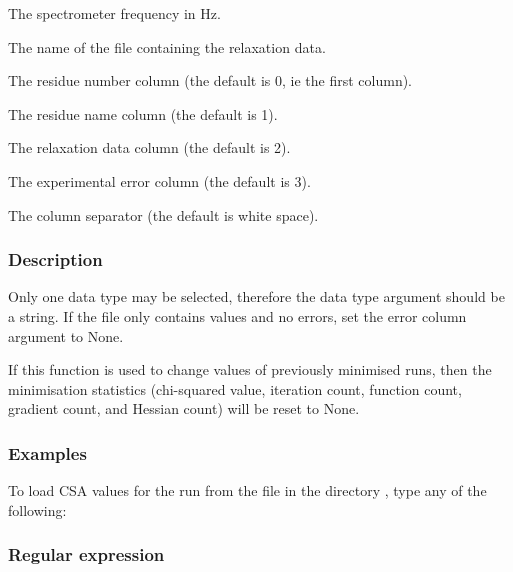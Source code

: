   The spectrometer frequency in Hz. 

  The name of the file containing the relaxation data. 

  The residue number column (the default is 0, ie the first column). 

  The residue name column (the default is 1). 

  The relaxation data column (the default is 2). 

  The experimental error column (the default is 3). 

  The column separator (the default is white space). 




\subsubsection{Description}

Only one data type may be selected, therefore the data type argument should be a string.  If the file only contains values and no errors, set the error column argument to None.


If this function is used to change values of previously minimised runs, then the minimisation statistics (chi-squared value, iteration count, function count, gradient count, and Hessian count) will be reset to None.



\subsubsection{Examples}

To load CSA values for the run  from the file  in the directory , type any of the following:






\subsubsection{Regular expression}

